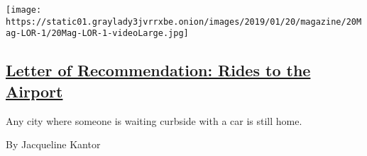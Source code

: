 \begin{enumerate}
  \texttt{[image: https://static01.graylady3jvrrxbe.onion/images/2019/01/20/magazine/20Mag-LOR-1/20Mag-LOR-1-videoLarge.jpg]}

  \hypertarget{letter-of-recommendation-rides-to-the-airport}{%
  \subsection{\texorpdfstring{\href{/2019/01/15/magazine/letter-of-recommendation-rides-to-the-airport.html}{Letter
  of Recommendation: Rides to the
  Airport}}{Letter of Recommendation: Rides to the Airport}}\label{letter-of-recommendation-rides-to-the-airport}}

  Any city where someone is waiting curbside with a car is still home.

  By Jacqueline Kantor
\end{enumerate}

